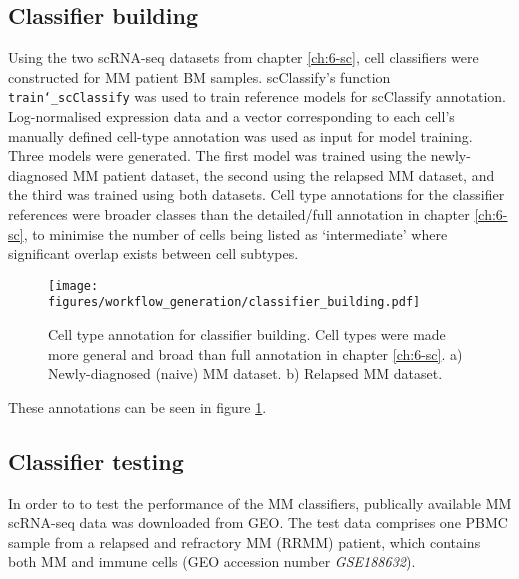 \subsection{Classifier building}\label{subsec:MM_classifier_model_building}
Using the two scRNA-seq datasets from chapter \ref{ch:6-sc}, cell classifiers were constructed for MM patient BM samples.
scClassify's function \texttt{train\char`_scClassify} was used to train reference models for scClassify annotation.
Log-normalised expression data and a vector corresponding to each cell's manually defined cell-type annotation was used as input for model training.
Three models were generated.
The first model was trained using the newly-diagnosed MM patient dataset, the second using the relapsed MM dataset, and the third was trained using  both datasets.
Cell type annotations for the classifier references were broader classes than the detailed/full annotation in chapter \ref{ch:6-sc}, to minimise the number of cells being listed as `intermediate' where significant overlap exists between cell subtypes.
\begin{figure}[htb]
\centering
\texttt{[image: figures/workflow\_generation/classifier\_building.pdf]}
\caption[Classifier annotation building]{Cell type annotation for classifier building.
Cell types were made more general and broad than full annotation in chapter \ref{ch:6-sc}.
a) Newly-diagnosed (naive) MM dataset.
b) Relapsed MM dataset.}
\label{fig:classifier_building}
\end{figure}
%
These annotations can be seen in figure \ref{fig:classifier_building}.

\subsection{Classifier testing}
In order to to test the performance of the MM classifiers, publically available MM scRNA-seq data was downloaded from GEO\@.
The test data comprises one PBMC sample from a relapsed and refractory MM (RRMM) patient, which contains both MM and immune cells (GEO accession number \textit{GSE188632}).

